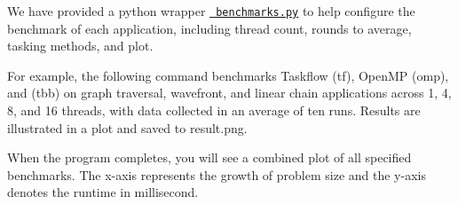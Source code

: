 We have provided a python wrapper \href{./benchmarks.py}{\texttt{ benchmarks.\+py}} to help configure the benchmark of each application, including thread count, rounds to average, tasking methods, and plot.


\begin{DoxyCode}{0}

\end{DoxyCode}


For example, the following command benchmarks Taskflow (tf), Open\+MP (omp), and  (tbb) on graph traversal, wavefront, and linear chain applications across 1, 4, 8, and 16 threads, with data collected in an average of ten runs. Results are illustrated in a plot and saved to {\ttfamily result.\+png}.


\begin{DoxyCode}{0}

\end{DoxyCode}


When the program completes, you will see a combined plot of all specified benchmarks. The x-\/axis represents the growth of problem size and the y-\/axis denotes the runtime in millisecond.



 
